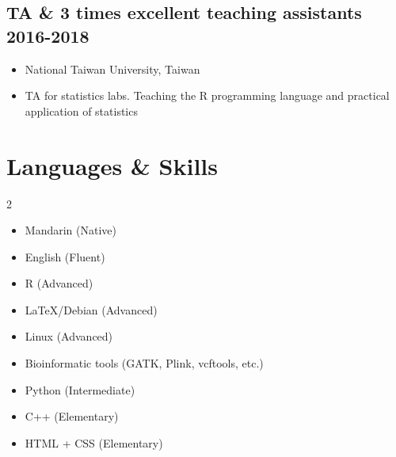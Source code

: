 \documentclass[10pt]{article}
\begin{document}
\subsection*{TA \& 3 times excellent teaching assistants \hfill 2016-2018}
\begin{itemize}
\item National Taiwan University, Taiwan
\item TA for statistics labs. Teaching the R programming language and practical application of statistics
\end{itemize}



\section*{Languages \& Skills}
\begin{multicols}{2}
\begin{itemize}
\item Mandarin (Native)
\item English (Fluent)
\item R (Advanced)
\item LaTeX/Debian (Advanced)
\item Linux (Advanced)
\item Bioinformatic tools (GATK, Plink, vcftools, etc.)
\item Python (Intermediate)
\item C++ (Elementary)
\item HTML + CSS (Elementary)
\end{itemize}
\end{multicols}


\end{document}
